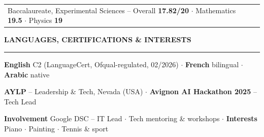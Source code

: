 \documentclass[10pt, a4paper]{article}
\makeatletter
\newcommand{\headfont}{\sffamily}
\newlength{\mainInner}\setlength{\mainInner}{\textwidth}
\providecommand{\cvFit}{1.0}
\newlength{\cvMainHeight}
\newlength{\cvMainAvail}
\newlength{\cvgap}
\newcommand{\vgap}[1]{\setlength{\cvgap}{#1}\vspace{\cvFit\cvgap}}
\newcommand{\mainSection}[1]{%
  \vgap{6pt}%
  {\headfont\color{sectionColor}\fontsize{10pt}{11.5pt}\selectfont\bfseries\MakeUppercase{#1}}\par%
  \nointerlineskip\vgap{2pt}%
  {\color{ruleColor}\rule{\mainInner}{0.8pt}}\par\vgap{4pt}%
}
\newcommand{\cvOneLine}[2]{%
  \begin{tabularx}{\mainInner}{@{}X r@{}}
    {\headfont\fontsize{10pt}{11.5pt}\selectfont #1} &
    {\headfont\color{mutedText}\fontsize{8.5pt}{10pt}\selectfont #2}
  \end{tabularx}\par\vgap{4pt}%
}
\makeatother
\begin{document}
\begin{lrbox}{\cvMainBox}
\begin{minipage}[t]{\mainInner}
  \cvOneLine{Baccalaureate, Experimental Sciences {\normalfont\fontsize{9pt}{10pt}\selectfont
    -- Overall \textbf{17.82/20} $\cdot$ Mathematics \textbf{19.5} $\cdot$ Physics \textbf{19}}}{2022}

  \mainSection{Languages, Certifications \& Interests}
  {\fontsize{9pt}{13pt}\selectfont
    \textbf{English} C2 (LanguageCert, Ofqual-regulated, 02/2026) $\cdot$
    \textbf{French} bilingual $\cdot$ \textbf{Arabic} native\par\vspace{3pt}
    \textbf{AYLP} -- Leadership \& Tech, Nevada (USA) $\cdot$
    \textbf{Avignon AI Hackathon 2025} -- Tech Lead\par\vspace{3pt}
    \textbf{Involvement} Google DSC -- IT Lead $\cdot$ Tech mentoring \& workshops $\cdot$
    \textbf{Interests} Piano $\cdot$ Painting $\cdot$ Tennis \& sport\par
  }

\end{minipage}%
\end{lrbox}%
\setlength{\cvMainHeight}{\dimexpr\ht\cvMainBox+\dp\cvMainBox\relax}%
%
\usebox{\cvMainBox}%
\end{document}

